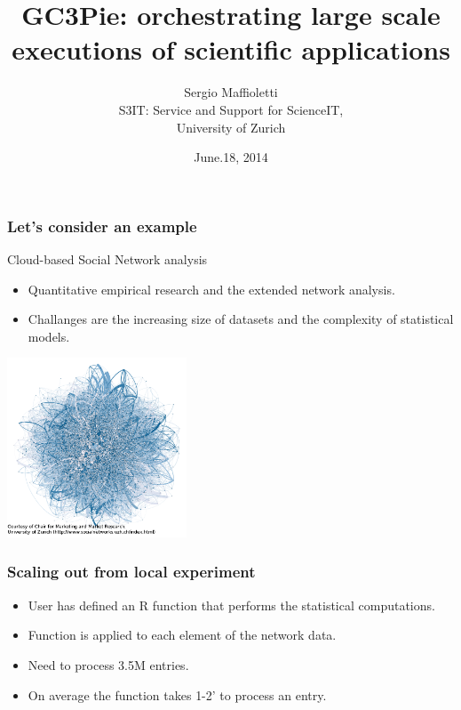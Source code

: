 \documentclass[english,serif,mathserif,xcolor=pdftex,dvipsnames,table]{beamer}
\title[GC3Pie]{%
  GC3Pie: orchestrating large scale executions of scientific applications
}
\author[Sergio Maffioletti]{%
  Sergio Maffioletti \\
  S3IT: Service and Support for ScienceIT, \\
  University of Zurich
}
\date{June.18, 2014}
\begin{document}
\maketitle







\begin{frame}
  \frametitle{Let's consider an example}
  \begin{block}{Cloud-based Social Network analysis}
    \begin{itemize}
    \item Quantitative {\color{Blue}empirical} research and the extended
      {\color{Blue}network analysis}.\\
    \item Challanges are the {\color{Blue}increasing size} of datasets and
      the {\color{Blue}complexity} of statistical models.
    \end{itemize}
  \end{block}
  \begin{center}
    \includegraphics[width=0.4\textwidth]{fig/network.png} \\
  \end{center}
\end{frame}

\begin{frame}
  \frametitle{Scaling out from local experiment}
  \begin{itemize}
  \item User has defined an {\color{Blue}R function} that performs the statistical computations.
  \item Function is applied to  {\color{Blue}each element} of the network data.
  \item Need to process {\color{Blue}3.5M} entries.
  \item On average the function takes {\color{Blue}1-2'} to process an entry.
  \end{itemize}
\end{frame}
\end{document}
